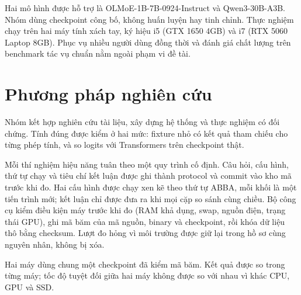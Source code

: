 Hai mô hình được hỗ trợ là OLMoE-1B-7B-0924-Instruct và Qwen3-30B-A3B. Nhóm dùng checkpoint công bố, không huấn luyện hay tinh chỉnh. Thực nghiệm chạy trên hai máy tính xách tay, ký hiệu i5 (GTX 1650 4GB) và i7 (RTX 5060 Laptop 8GB). Phục vụ nhiều người dùng đồng thời và đánh giá chất lượng trên benchmark tác vụ chuẩn nằm ngoài phạm vi đề tài.

\section{Phương pháp nghiên cứu}

Nhóm kết hợp nghiên cứu tài liệu, xây dựng hệ thống và thực nghiệm có đối chứng. Tính đúng được kiểm ở hai mức: fixture nhỏ có kết quả tham chiếu cho từng phép tính, và so logits với Transformers trên checkpoint thật.

Mỗi thí nghiệm hiệu năng tuân theo một quy trình cố định. Câu hỏi, cấu hình, thứ tự chạy và tiêu chí kết luận được ghi thành protocol và commit vào kho mã trước khi đo. Hai cấu hình được chạy xen kẽ theo thứ tự ABBA, mỗi khối là một tiến trình mới; kết luận chỉ được đưa ra khi mọi cặp so sánh cùng chiều. Bộ công cụ kiểm điều kiện máy trước khi đo (RAM khả dụng, swap, nguồn điện, trạng thái GPU), ghi mã băm của mã nguồn, binary và checkpoint, rồi khóa dữ liệu thô bằng checksum. Lượt đo hỏng vì môi trường được giữ lại trong hồ sơ cùng nguyên nhân, không bị xóa.

Hai máy dùng chung một checkpoint đã kiểm mã băm. Kết quả được so trong từng máy; tốc độ tuyệt đối giữa hai máy không được so với nhau vì khác CPU, GPU và SSD.
